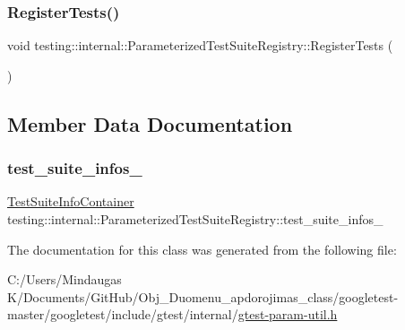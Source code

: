 \mbox{\label{classtesting_1_1internal_1_1_parameterized_test_suite_registry_a44c2ee0296de42dc6ca7abbf48d00495}} 
\subsubsection{\texorpdfstring{RegisterTests()}{RegisterTests()}\hspace{0.1cm}{\footnotesize\ttfamily [2/2]}}
{\footnotesize\ttfamily void testing\+::internal\+::\+Parameterized\+Test\+Suite\+Registry\+::\+Register\+Tests (\begin{DoxyParamCaption}{ }\end{DoxyParamCaption})\hspace{0.3cm}{\ttfamily [inline]}}



\subsection{Member Data Documentation}
\mbox{\label{classtesting_1_1internal_1_1_parameterized_test_suite_registry_afb0271d017a518724a075986bd16c69c}} 
\subsubsection{\texorpdfstring{test\_suite\_infos\_}{test\_suite\_infos\_}}
{\footnotesize\ttfamily \mbox{\hyperlink{classtesting_1_1internal_1_1_parameterized_test_suite_registry_a39a8d3dfa91cb48329bfcf0853f0e72b}{Test\+Suite\+Info\+Container}} testing\+::internal\+::\+Parameterized\+Test\+Suite\+Registry\+::test\+\_\+suite\+\_\+infos\+\_\+\hspace{0.3cm}{\ttfamily [private]}}



The documentation for this class was generated from the following file\+:\begin{DoxyCompactItemize}
\item 
C\+:/\+Users/\+Mindaugas K/\+Documents/\+Git\+Hub/\+Obj\+\_\+\+Duomenu\+\_\+apdorojimas\+\_\+class/googletest-\/master/googletest/include/gtest/internal/\mbox{\hyperlink{googletest-master_2googletest_2include_2gtest_2internal_2gtest-param-util_8h}{gtest-\/param-\/util.\+h}}\end{DoxyCompactItemize}
